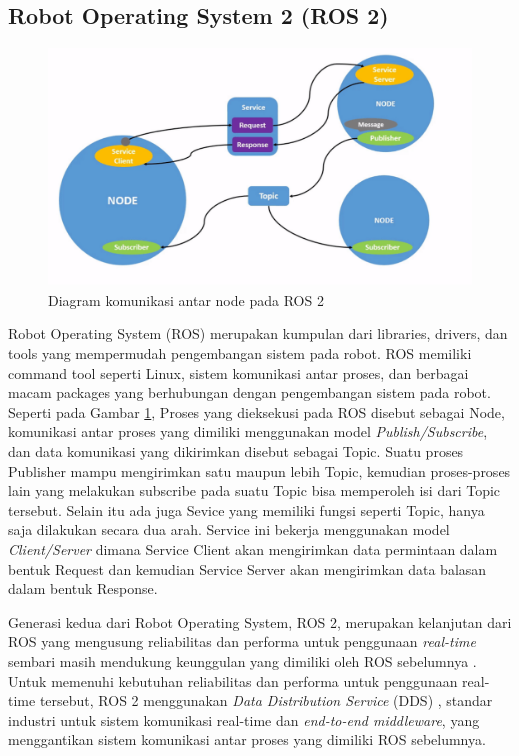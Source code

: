 \subsection{Robot Operating System 2 (ROS 2)}

\begin{figure} [ht] \centering
	\includegraphics[scale=0.45]{gambar/ros-communication.png}
	\caption{Diagram komunikasi antar node pada ROS 2 \citep{Ros2Nodes}}
	\label{fig:RosCommunication}
\end{figure}

Robot Operating System (ROS) \citep{Quigley2009} merupakan kumpulan dari libraries, drivers, dan tools yang mempermudah pengembangan sistem pada robot.
ROS memiliki command tool seperti Linux, sistem komunikasi antar proses, dan berbagai macam packages yang berhubungan dengan pengembangan sistem pada robot.
Seperti pada Gambar \ref{fig:RosCommunication}, Proses yang dieksekusi pada ROS disebut sebagai Node, komunikasi antar proses yang dimiliki menggunakan model \emph{Publish/Subscribe}, dan data komunikasi yang dikirimkan disebut sebagai Topic.
Suatu proses Publisher mampu mengirimkan satu maupun lebih Topic, kemudian proses-proses lain yang melakukan subscribe pada suatu Topic bisa memperoleh isi dari Topic tersebut.
Selain itu ada juga Sevice yang memiliki fungsi seperti Topic, hanya saja dilakukan secara dua arah.
Service ini bekerja menggunakan model \emph{Client/Server} dimana Service Client akan mengirimkan data permintaan dalam bentuk Request dan kemudian Service Server akan mengirimkan data balasan dalam bentuk Response.

Generasi kedua dari Robot Operating System, ROS 2, merupakan kelanjutan dari ROS yang mengusung reliabilitas dan performa untuk penggunaan \emph{real-time} sembari masih mendukung keunggulan yang dimiliki oleh ROS sebelumnya \citep{Maruyama2016}.
Untuk memenuhi kebutuhan reliabilitas dan performa untuk penggunaan real-time tersebut, ROS 2 menggunakan \emph{Data Distribution Service} (DDS) \citep{Castellote2003} \citep{Schlesselman2004}, standar industri untuk sistem komunikasi real-time dan \emph{end-to-end middleware}, yang menggantikan sistem komunikasi antar proses yang dimiliki ROS sebelumnya.

